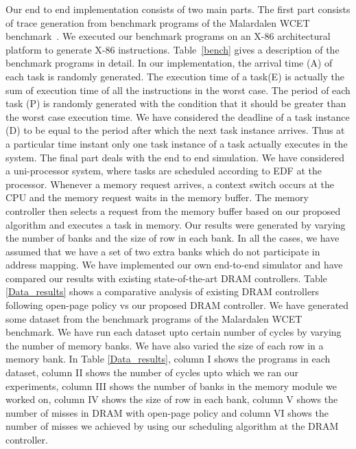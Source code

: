 \noindent
Our end to end implementation consists of two main parts. The first part consists of trace generation from benchmark programs 
of the Malardalen WCET benchmark~\cite{gustafsson2010malardalen}. We executed our benchmark programs on an X-86 architectural 
platform to generate X-86 instructions. Table~\ref{bench} gives a description of the benchmark programs in detail. 
In our implementation, the arrival time (A) of each task is randomly generated. The execution time of a task(E) is actually the 
sum of execution time of all the instructions in the worst case. The period of each task (P) is randomly generated with the 
condition that it should 
be greater than the worst case execution time. We have considered the deadline of a task instance (D) to be equal to 
the period after which the next task instance arrives. Thus at a particular time instant only one task 
instance of a task actually executes in the system. 
The final part deals with the end to end simulation. 
We have considered a uni-processor system, where tasks are scheduled according to EDF at the processor. Whenever a memory 
request arrives, a context switch occurs at the CPU and the memory request waits in the memory buffer. The memory controller 
then selects a request from the memory buffer based on our proposed algorithm and executes a task in memory. Our results were
generated by varying the number of banks and the size of row in each bank. In all the cases, we have assumed that we have a set 
of two extra banks which do not participate in address mapping. We have 
implemented our own end-to-end simulator and have compared our results with existing state-of-the-art DRAM controllers. 
Table \ref{Data_results} shows a comparative analysis of existing DRAM controllers following open-page policy vs our proposed DRAM 
controller. We have generated some dataset from the benchmark programs of the Malardalen WCET benchmark. We have run each dataset
upto certain number of cycles by varying the number of memory banks. We have also varied the size of each row in a memory bank.
In Table \ref{Data_results}, column I shows the programs in each dataset, column II shows the number of cycles upto which we ran our 
experiments, column III shows the number of banks in the memory module we worked on, column IV shows the size of row in each 
bank, column V shows the number of misses in DRAM with open-page policy and column VI shows the number of misses we achieved by using 
our scheduling algorithm at the DRAM controller.








